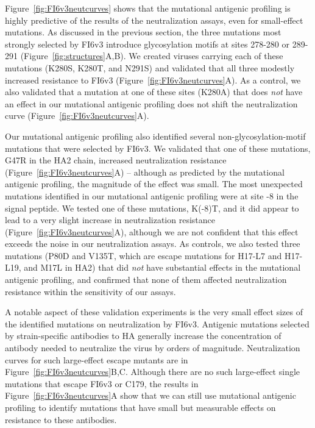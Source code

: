 \documentclass[11pt]{article}
\begin{document}
Figure~\ref{fig:FI6v3neutcurves} shows that the mutational antigenic profiling is highly predictive of the results of the neutralization assays, even for small-effect mutations.
As discussed in the previous section, the three mutations most strongly selected by FI6v3 introduce glycosylation motifs at sites 278-280 or 289-291 (Figure~\ref{fig:structures}A,B).
We created viruses carrying each of these mutations (K280S, K280T, and N291S) and validated that all three modestly increased resistance to FI6v3 (Figure~\ref{fig:FI6v3neutcurves}A).
As a control, we also validated that a mutation at one of these sites (K280A) that does \emph{not} have an effect in our mutational antigenic profiling does not shift the neutralization curve (Figure~\ref{fig:FI6v3neutcurves}A).

Our mutational antigenic profiling also identified several non-glycosylation-motif mutations that were selected by FI6v3.
We validated that one of these mutations, G47R in the HA2 chain, increased neutralization resistance (Figure~\ref{fig:FI6v3neutcurves}A) -- although as predicted by the mutational antigenic profiling, the magnitude of the effect was small.
The most unexpected mutations identified in our mutational antigenic profiling were at site -8 in the signal peptide.
We tested one of these mutations, K(-8)T, and it did appear to lead to a very slight increase in neutralization resistance (Figure~\ref{fig:FI6v3neutcurves}A), although we are not confident that this effect exceeds the noise in our neutralization assays.
As controls, we also tested three mutations (P80D and V135T, which are escape mutations for H17-L7 and H17-L19, and M17L in HA2) that did \emph{not} have substantial effects in the mutational antigenic profiling, and confirmed that none of them affected neutralization resistance within the sensitivity of our assays.

A notable aspect of these validation experiments is the very small effect sizes of the identified mutations on neutralization by FI6v3.
Antigenic mutations selected by strain-specific antibodies to HA generally increase the concentration of antibody needed to neutralize the virus by orders of magnitude.
Neutralization curves for such large-effect escape mutants are in Figure~\ref{fig:FI6v3neutcurves}B,C.
Although there are no such large-effect single mutations that escape FI6v3 or C179, the results in Figure~\ref{fig:FI6v3neutcurves}A show that we can still use mutational antigenic profiling to identify mutations that have small but measurable effects on resistance to these antibodies.
\end{document}
